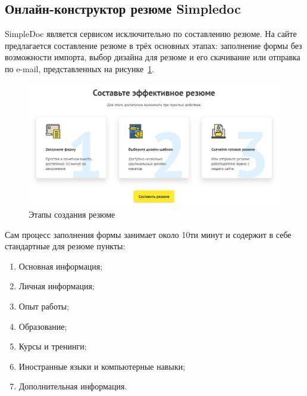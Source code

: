 \documentclass[master, och, diploma]{SCWorks}
\begin{document}
\subsection{Онлайн-конструктор резюме Simpledoc}
SimpleDoc является сервисом исключительно по составлению резюме. На сайте предлагается составление резюме в трёх основных этапах: заполнение формы без возможности импорта, выбор дизайна для резюме и его скачивание или отправка по e-mail, представленных на рисунке~\ref{fig:15}.
\begin{figure}[!ht]
    \centering
    \includegraphics[width=12cm]{images/image5.png}
    \caption{\label{fig:15}%
        Этапы создания резюме}
\end{figure}

Сам процесс заполнения формы занимает около 10ти минут и содержит в себе стандартные для резюме пункты:
\begin{enumerate}
    \item Основная информация;
    \item Личная информация;
    \item Опыт работы;
    \item Образование;
    \item Курсы и тренинги;
    \item Иностранные языки и компьютерные навыки;
    \item Дополнительная информация.
\end{enumerate}
\end{document}
